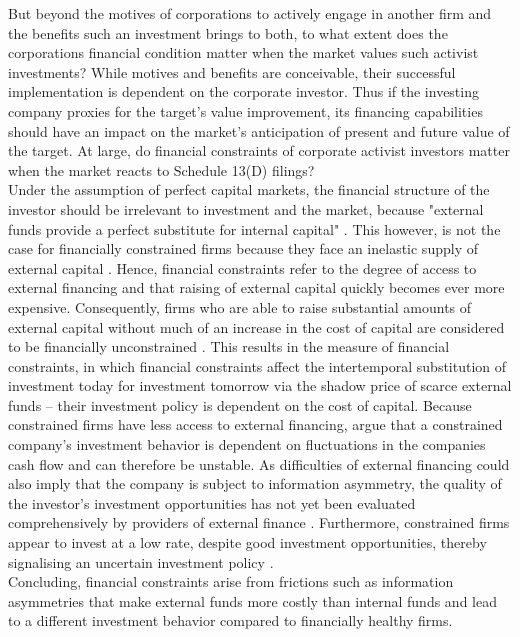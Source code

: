 \documentclass[12pt]{article}
\begin{document}
But beyond the motives of corporations to actively engage in another firm and the benefits such an investment brings to both, to what extent does the corporations financial condition matter when the market values such activist investments?  While motives and benefits are conceivable, their successful implementation is dependent on the corporate investor. 
Thus if the investing company proxies for the target's value improvement, its financing capabilities should have an impact on the market's anticipation of present and future value of the target. At large, do financial constraints of corporate activist investors matter when the market reacts to Schedule 13(D) filings?\\
Under the assumption of perfect capital markets, the financial structure of the investor should be irrelevant to investment and the market, because "external funds provide a perfect substitute for internal capital" \citep[p. 141]{Fazzari1988}. This however, is not the case for financially constrained firms because they face an inelastic supply of external capital \citep[p.1]{Farre-mensa2013}. Hence, financial constraints refer to the degree of access to external financing and that raising of external capital quickly becomes ever more expensive. Consequently, firms who are able to raise substantial amounts of external capital without much of an increase in the cost of capital are considered to be financially unconstrained \citep[p.1]{Farre-mensa2013}. This results in the \citet[p.531]{Whited2006} measure of financial constraints, in which financial constraints affect the intertemporal substitution of investment today for investment tomorrow via the shadow price of scarce external funds -- their investment policy is dependent on the cost of capital. Because constrained firms have less access to external financing, \citet[p. 142]{Fazzari1988} argue that a constrained company's investment behavior is dependent on fluctuations in the companies cash flow and can therefore be unstable. As difficulties of external financing could also imply that the company is subject to information asymmetry, the quality of the investor's investment opportunities has not yet been evaluated comprehensively by providers of external finance \citep[p.142]{Fazzari1988}. Furthermore, constrained firms appear to invest at a low rate, despite good investment opportunities, thereby signalising an uncertain investment policy \citep[p.533]{Whited2006}.\\
Concluding, financial constraints arise from frictions such as information asymmetries that make external funds more costly than internal funds and lead to a different investment behavior compared to financially healthy firms. 
\end{document}
